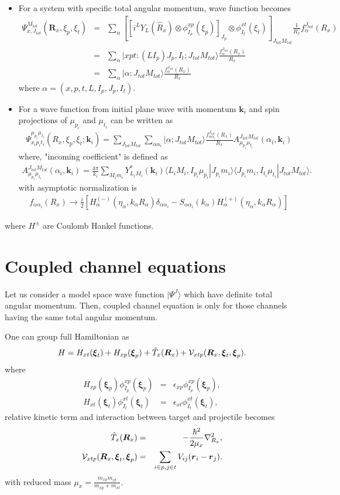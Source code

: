 \documentclass[11pt]{book}
\def\bm{\boldsymbol}
\def\vk{{\bm k}}
\def\vr{{\bm r}}
\def\vR{{\bm R}}
\def\la{\langle}
\def\ra{\rangle}
\newcommand{\bea}{\begin{eqnarray}}
\newcommand{\eea}{\end{eqnarray}}
\newcommand{\no}{\nonumber \\}
\begin{document}
\begin{itemize} 
	\item For a system with specific total angular momentum, wave function becomes
	\bea 
	\Psi_{x,J_{tot}}^{M_{tot}}(\vR_x,\xi_p,\xi_t)
	&=&\sum_{\alpha} \left[ 
	\left[i^{L} Y_{L}(\hat{R}_x)\otimes \phi^{xp}_{I_p}(\xi_p)\right]_{J_p} 
	\otimes \phi^{xt}_{I_t}(\xi_t)\right]_{J_{tot}M_{tot}}
	\frac{1}{R_x}f_{\alpha}^{J_{tot}}(R_x) \no 
	&=&\sum_{\alpha} |xpt:(L I_p) J_p,I_t;J_{tot} M_{tot}\ra 
	\frac{f_{\alpha}^{J_{tot}}(R_x) }{R_x} \no 
	&=&\sum_{\alpha} |\alpha; J_{tot} M_{tot}\ra \frac{f_{\alpha}^{J_{tot}}(R_x) }{R_x}
	\eea 
	where $\alpha=(x,p,t,L,I_p,J_p,I_t)$.
	
	\item For a wave function from initial plane wave with momentum $\vk_i$ and spin projections of
	$\mu_{p_i}$ and $\mu_{t_i}$ can be written as 
	\bea 
	\Psi_{x_ip_it_i}^{\mu_{p_i}\mu_{t_i}}(R_x,\xi_p,\xi_t; \vk_i)
	=\sum_{J_{tot}M_{tot}}\sum_{\alpha \alpha_i}
	|\alpha;J_{tot}M_{tot}\ra 
	\frac{f^{J_{tot}}_{\alpha \alpha_i}(R_x)  }{R_x} 
	A^{J_{tot} M_{tot}}_{\mu_{p_i}\mu_{t_i}}(\alpha_i,\vk_i)
	\eea  
	where, "incoming coefficient" is defined as
	\bea 
	A^{J_{tot} M_{tot}}_{\mu_{p_i}\mu_{t_i}}(\alpha_i,\vk_i)
	=\frac{4\pi}{k_i}\sum_{M_i m_i} Y^*_{L_iM_i}(\vk_i)
	\la L_iM_i,I_{p_i} \mu_{p_i}| J_{p_i} m_i\ra 
	\la J_{p_i} m_i,I_{t_i}\mu_{t_i}|J_{tot} M_{tot}\ra. 
	\eea  
	with asymptotic normalization is 
	\bea 
	f_{\alpha\alpha_i}(R_x)\to 
	\frac{i}{2}[H_\alpha^{(-)}(\eta_\alpha,k_\alpha R_\alpha)\delta_{\alpha\alpha_i}
	-S_{\alpha\alpha_i}(k_\alpha) H_\alpha^{(+)}(\eta_\alpha,k_\alpha R_\alpha)]
	\eea 
	
\end{itemize}

where $H^{\pm}$ are Coulomb Hankel functions.

\section{Coupled channel equations}

Let us consider a model space wave function $|\Psi^J\ra$ which have definite 
total angular momentum. Then, coupled channel equation is only for those 
channels having the same total angular momentum. 

One can group full Hamiltonian as
\bea
H= H_{xt}({\bm \xi}_t)+H_{xp}({\bm \xi}_p)+\hat{T}_x({\bm R}_x)+{\cal V}_{xtp}({\bm R}_x,{\bm \xi}_t,{\bm \xi}_p).
\eea 
where 
\bea 
H_{xp}({\bm \xi}_p) \phi^{xp}_{I_p}({\bm \xi}_p)&=&\epsilon_{xp}\phi_{I_p}^{xp}({\bm \xi}_p),\no 
H_{xt}({\bm \xi}_t) \phi^{xt}_{I_t}({\bm \xi}_t)&=&\epsilon_{xt}\phi_{I_t}^{xt}({\bm \xi}_t),
\eea 
relative kinetic term and interaction between target and projectile becomes 
\bea 
\hat{T}_x({\bm R}_x)&=&-\frac{\hbar^2}{2\mu_x}\nabla_{R_x}^2,\no 
{\cal V}_{xtp}({\bm R}_x,{\bm \xi}_t,{\bm \xi}_p)&=&\sum_{i\in p, j\in t} V_{ij}(\vr_i-\vr_j).
\eea 
with reduced mass $\mu_x=\frac{m_{xp}m_{xt}}{m_{xp}+m_{xt}}$.
\end{document}
